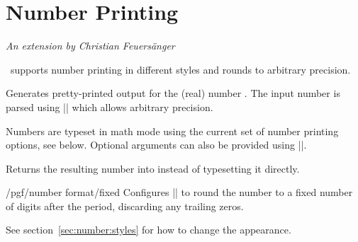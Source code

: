 \section{Number Printing}

\label{pgfmath-numberprinting}%

{\emph{An extension by Christian Feuers\"anger}}

\medskip
\noindent
\pgfname\ supports number printing in different styles and rounds to arbitrary precision.

\begin{command}{\pgfmathprintnumber{}}
  Generates pretty-printed output for the (real) number . The
  input number  is parsed using |\pgfmathfloatparsenumber|
  which allows arbitrary precision. 

  Numbers are typeset in math mode using the current set of number
  printing options, see below. Optional arguments can also be provided
  using ||. 
\end{command}

\begin{command}{\pgfmathprintnumberto{}}
  Returns the resulting number into 
  instead of typesetting it directly.	 
\end{command}

\begin{key}{/pgf/number format/fixed}
  Configures |\pgfmathprintnumber| to round the number to a fixed
  number of digits after the period, discarding any trailing zeros. 

\begin{codeexample}[]
\hspace{1em}
\hspace{1em}
\hspace{1em}
\hspace{1em}
\end{codeexample}

  See section~\ref{sec:number:styles} for how to change the
  appearance. 
\end{key}

